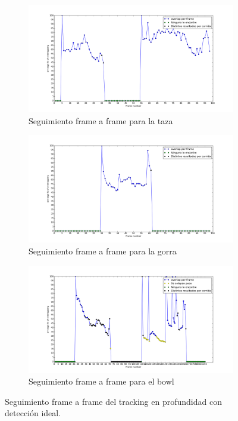 \begin{figure}
	\centering
	\begin{subfigure}[b]{0.9\textwidth}
		\includegraphics[width=\textwidth]{img/frame_a_frame/depth-taza.png}
		\caption{Seguimiento frame a frame para la taza}
		\label{frame_frame_d_taza}
	\end{subfigure}
	\begin{subfigure}[b]{0.9\textwidth}
		\includegraphics[width=\textwidth]{img/frame_a_frame/depth-gorra.png}
		\caption{Seguimiento frame a frame para la gorra}
		\label{frame_frame_d_gorra}
	\end{subfigure}
	\begin{subfigure}[b]{0.9\textwidth}
		\includegraphics[width=\textwidth]{img/frame_a_frame/depth-bowl.png}
		\caption{Seguimiento frame a frame para el bowl}
		\label{frame_frame_d_bowl}
	\end{subfigure}
	\caption{Seguimiento frame a frame del tracking en profundidad con detección ideal.}
	\label{frame_frame_d}
\end{figure}


